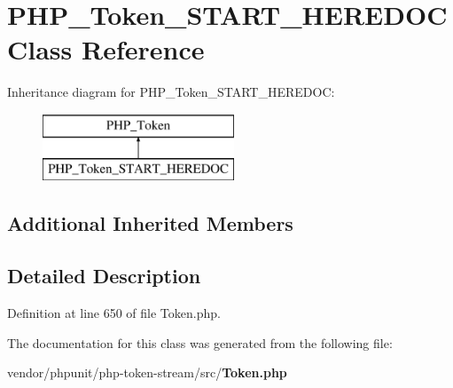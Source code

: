 \section{P\+H\+P\+\_\+\+Token\+\_\+\+S\+T\+A\+R\+T\+\_\+\+H\+E\+R\+E\+D\+O\+C Class Reference}
\label{class_p_h_p___token___s_t_a_r_t___h_e_r_e_d_o_c}
Inheritance diagram for P\+H\+P\+\_\+\+Token\+\_\+\+S\+T\+A\+R\+T\+\_\+\+H\+E\+R\+E\+D\+O\+C\+:\begin{figure}[H]
\begin{center}
\leavevmode
\includegraphics[height=2.000000cm]{class_p_h_p___token___s_t_a_r_t___h_e_r_e_d_o_c}
\end{center}
\end{figure}
\subsection*{Additional Inherited Members}


\subsection{Detailed Description}


Definition at line 650 of file Token.\+php.



The documentation for this class was generated from the following file\+:\begin{DoxyCompactItemize}
\item 
vendor/phpunit/php-\/token-\/stream/src/{\bf Token.\+php}\end{DoxyCompactItemize}

